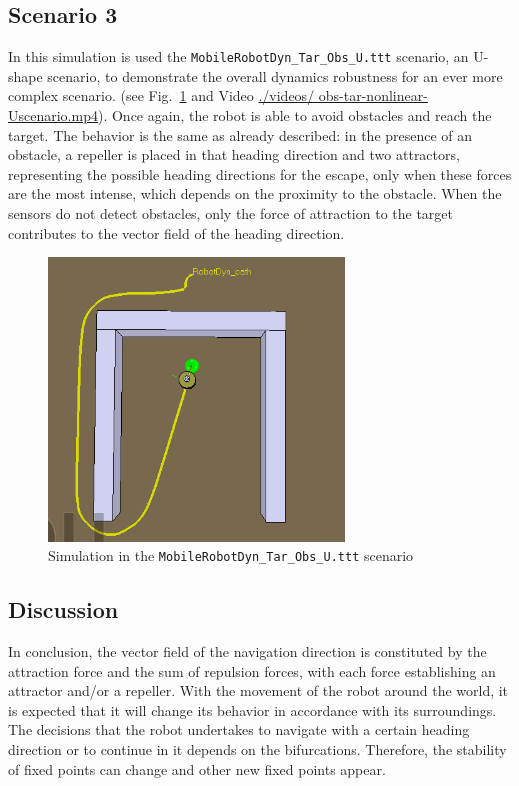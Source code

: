 \subsection{Scenario 3}
In this simulation is used the \texttt{MobileRobotDyn\_Tar\_Obs\_U.ttt}
scenario, an U-shape scenario, to demonstrate the overall dynamics robustness
for an ever more complex scenario.
(see Fig.~\ref{fig:obs-tar-nonlinear-scenario3} and Video \href{run:./videos/obs-tar-nonlinear-Uscenario.mp4}{./videos/
obs-tar-nonlinear-Uscenario.mp4}). Once again, the robot is able to avoid obstacles and reach the target.
The behavior is the same as already described: in the presence of an obstacle,
a repeller is placed in that heading direction and two attractors,
representing the possible heading directions for the escape, only when these
forces are the most intense, which depends on the proximity to the
obstacle. When the sensors do not detect obstacles, only the force of attraction
to the target
contributes to the vector field of the heading direction.
%
\begin{figure}[htb!]
  \centering
  \includegraphics[width=0.7\textwidth]{img/mapa2.PNG}
  \caption{Simulation in the \texttt{MobileRobotDyn\_Tar\_Obs\_U.ttt} scenario}%
  \label{fig:obs-tar-nonlinear-scenario3}
\end{figure}

\subsection{Discussion}
In conclusion, the vector field of the navigation direction is constituted by
the attraction force and the sum of repulsion forces, with each force establishing an attractor and/or a repeller. With the movement of the robot around the world, it is expected that it will change its behavior in accordance with its surroundings. The decisions that the robot undertakes to navigate with a certain heading direction or to continue in it depends on the bifurcations.
Therefore, the stability of fixed points can change and other new fixed points
appear.


